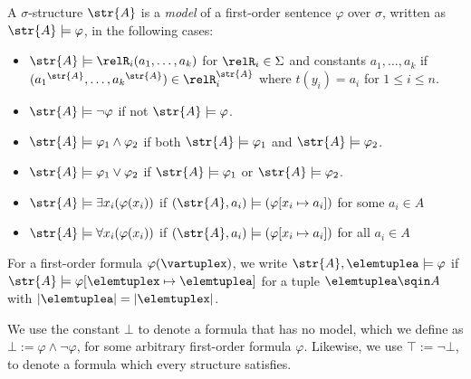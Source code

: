 \begin{definition}
  A $\sigma$-structure $\str{A}$ is a \emph{model} of a first-order sentence $\varphi$ over $\sigma$, written as $\str{A} \models \varphi$, in the following cases:
\begin{itemize}
  \item $\str{A} \models \relR_{i}(a_{1}, \ldots, a_{k})$ for $\relR_{i} \in \Sigma$ and constants $a_{1}, \ldots, a_{k}$ if $({a_{1}}^{\str{A}}, \ldots, {a_{k}}^{\str{A}}) \in \relR_{i}^{\str{A}}$ where $t(y_{i}) = a_{i}$ for $1 \le i \le n$.
  \item $\str{A} \models \neg \varphi$ if not $\str{A} \models \varphi$.
  \item $\str{A} \models \varphi_{1} \land \varphi_{2}$ if both $\str{A} \models \varphi_{1}$ and $\str{A} \models \varphi_{2}$.
  \item $\str{A} \models \varphi_{1} \lor \varphi_{2}$ if $\str{A} \models \varphi_{1}$ or $\str{A} \models \varphi_{2}$.
  \item $\str{A} \models \exists{x_{i}} (\varphi(x_{i}))$ if $(\str{A}, a_{i}) \models (\varphi[x_{i} \mapsto a_{i}])$ for some $a_{i} \in A$
  \item $\str{A} \models \forall{x_{i}} (\varphi(x_{i}))$ if $(\str{A}, a_{i}) \models (\varphi[x_{i} \mapsto a_{i}])$ for all $a_{i} \in A$
\end{itemize}
For a first-order formula $\varphi(\vartuplex)$, we write $\str{A}, \elemtuplea \models \varphi$ if $\str{A} \models \varphi[\elemtuplex \mapsto \elemtuplea]$ for a tuple $\elemtuplea \sqin A$ with $|\elemtuplea| = |\elemtuplex|$.
\end{definition}
We use the constant $\bot$ to denote a formula that has no model, which we define as $\bot := \varphi \land \neg \varphi$, for some arbitrary first-order formula $\varphi$.
Likewise, we use $\top := \neg \bot$, to denote a formula which every structure satisfies.

